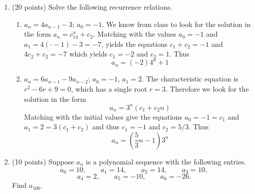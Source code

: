 \documentclass[12pt]{article}
\begin{document}
\begin{enumerate}
\item (20 points) Solve the following recurrence relations.
\begin{enumerate}
\item $a_n=4a_{n-1}-3$; $a_0=-1$.
We know from class to look for the solution in the form $a_n=c_14^n+c_2$. Matching with the values $a_0=-1$ and $a_1=4(\cdot -1)-3=-7$, yields the equations $c_1+c_2=-1$ and $4c_2+c_2=-7$ which yields $c_1=-2$ and $c_2=1$. Thus
\[
a_n=(-2)4^n+1
\]

\item $a_n=6a_{n-1}-9a_{n-2}$; $a_0=-1$, $a_1=2$.
The characteristic equation is $r^2-6r+9=0$, which has a single root $r=3$. Therefore we look for the solution in the form
\[
a_n=3^n(c_1+c_2n)
\]
Matching with the initial values give the equations $a_0=-1=c_1$ and $a_1=2=3(c_1+c_2)$ and thus $c_1=-1$ and $c_2=5/3$. Thus
\[
a_n=\left(\frac{5}{3}n-1\right)3^n
\]
\end{enumerate}
\newpage
\item (10 points) Suppose $a_n$ is a polynomial sequence with the following entries.
\[
a_0=10,\qquad a_1=14,\qquad a_2=14,\qquad
a_3=10,
\]
\[
a_4=2,\qquad
a_5=-10,\qquad
a_6=-26.
\]
Find $a_{100}$.


\end{enumerate}
\end{document}
